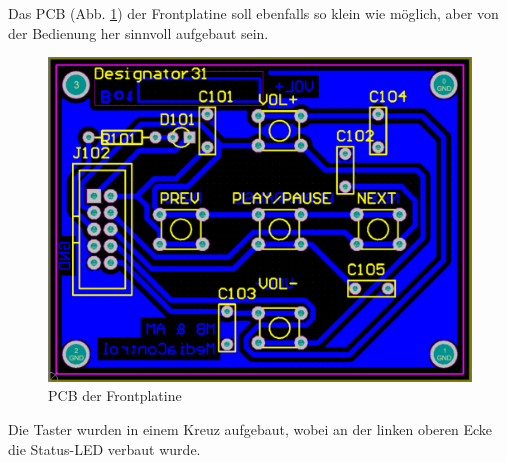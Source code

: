 Das PCB (Abb. \ref {fig:5.3.9.3.1}) der Frontplatine soll ebenfalls so klein wie möglich, aber von der Bedienung her sinnvoll aufgebaut sein.
\begin{figure} [H]
	\centering
	\includegraphics[width=1\textwidth]{img/BTModul/front_pcb.png}
	\caption{PCB der Frontplatine}\label {fig:5.3.9.3.1}
\end{figure}
Die Taster wurden in einem Kreuz aufgebaut, wobei an der linken oberen Ecke die Status-LED verbaut wurde.








